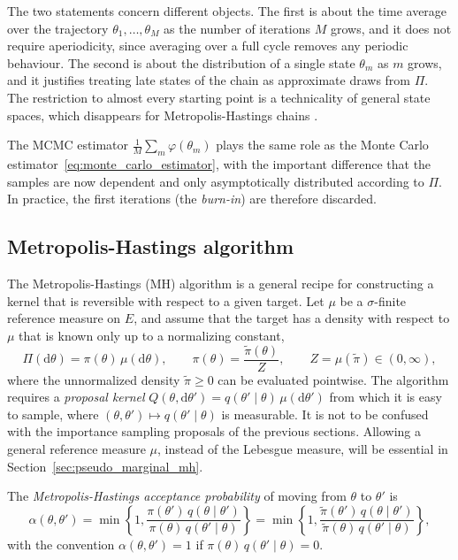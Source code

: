 The two statements concern different objects. The first is about the time average over the trajectory $\theta_1,\ldots,\theta_M$ as the number of iterations $M$ grows, and it does not require aperiodicity, since averaging over a full cycle removes any periodic behaviour. The second is about the distribution of a single state $\theta_m$ as $m$ grows, and it justifies treating late states of the chain as approximate draws from $\Pi$. The restriction to almost every starting point is a technicality of general state spaces, which disappears for Metropolis-Hastings chains \cite[Corollary~2]{tierney1994markov}.

The MCMC estimator $\frac{1}{M}\sum_m\varphi(\theta_m)$ plays the same role as the Monte Carlo estimator~\eqref{eq:monte_carlo_estimator}, with the important difference that the samples are now dependent and only asymptotically distributed according to $\Pi$. In practice, the first iterations (the \emph{burn-in}) are therefore discarded.

\subsection{Metropolis-Hastings algorithm}
\label{sec:metropolis_hastings}
The Metropolis-Hastings (MH) algorithm \cite{metropolis1953equation,hastings1970monte} is a general recipe for constructing a kernel that is reversible with respect to a given target. Let $\mu$ be a $\sigma$-finite reference measure on $E$, and assume that the target has a density with respect to $\mu$ that is known only up to a normalizing constant,
\begin{equation}
    \Pi(\mathrm{d}\theta) = \pi(\theta)\,\mu(\mathrm{d}\theta), \qquad \pi(\theta) = \frac{\tilde{\pi}(\theta)}{Z}, \qquad Z = \mu(\tilde{\pi})\in(0,\infty),
\end{equation}
where the unnormalized density $\tilde{\pi}\ge0$ can be evaluated pointwise. The algorithm requires a \emph{proposal kernel} $Q(\theta,\mathrm{d}\theta') = q(\theta'\mid\theta)\,\mu(\mathrm{d}\theta')$ from which it is easy to sample, where $(\theta,\theta')\mapsto q(\theta'\mid\theta)$ is measurable. It is not to be confused with the importance sampling proposals of the previous sections. Allowing a general reference measure $\mu$, instead of the Lebesgue measure, will be essential in Section~\ref{sec:pseudo_marginal_mh}.

\begin{definition}
    \label{def:mh_acceptance_probability}
    The \emph{Metropolis-Hastings acceptance probability} of moving from $\theta$ to $\theta'$ is
    \begin{equation}
        \alpha(\theta,\theta') = \min\left\{1,\frac{\pi(\theta')\,q(\theta\mid\theta')}{\pi(\theta)\,q(\theta'\mid\theta)}\right\} = \min\left\{1,\frac{\tilde{\pi}(\theta')\,q(\theta\mid\theta')}{\tilde{\pi}(\theta)\,q(\theta'\mid\theta)}\right\},
        \label{eq:mh_acceptance_probability}
    \end{equation}
    with the convention $\alpha(\theta,\theta') = 1$ if $\pi(\theta)\,q(\theta'\mid\theta) = 0$.
\end{definition}

